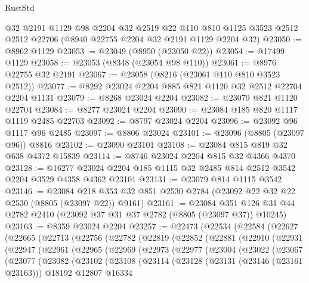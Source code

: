 \begin{lexlean}{RustStd}
\begin{coremodule}
    @32
    @2191
    @1129
    @98
    @2204
    @32
    @2519
    @22
    @110
    @810
    @1125
    @3523
    @2512
    @2512
    @22706
    (@8940 @22755 @2204 @32 @2191 @1129 @2204 @32)
@23050 := @8962 @1129
@23053 := @23049 (@8950 (@23050 @22))
@23054 := @17499 @1129
@23058 := @23053 (@8348 (@23054 @98 @110))
@23061 := @8976 @22755 @32 @2191
@23067 := @23058 (@8216 (@23061 @110 @810 @3523 @2512))
@23077 := @8292 @23024 @2204 @885 @821 @1120 @32 @2512 @22704 @2204 @1131
@23079 := @8268 @23024 @2204
@23082 := @23079 @821 @1120 @22704
@23084 := @8277 @23024 @2204
@23090 := @23084 @185 @820 @1117 @1119 @2485 @22703
@23092 := @8797 @23024 @2204
@23096 := @23092 @96 @1117 @96 @2485
@23097 := @8806 @23024
@23101 := @23096 (@8805 (@23097 @96)) @8816
@23102 := @23090 @23101
@23108 := @23084 @815 @819 @32 @638 @4372 @15839
@23114 := @8746 @23024 @2204 @815 @32 @4366 @4370
@23128 := @16277 @23024 @2204 @185 @1115 @32 @2485 @814 @2512 @3542 @2204 @3529 @4358 @4362 @23101
@23131 := @23079 @814 @1115 @3542
@23146 := @23084
    @218
    @353
    @32
    @851
    @2530
    @2784
    (@23092 @22 @32 @22 @2530 (@8805 (@23097 @22)) @9161)
@23161 := @23084
    @351
    @126
    @31
    @44
    @2782
    @2410
    (@23092 @37 @31 @37 @2782 (@8805 (@23097 @37)) @10245)
@23163 := @8359 @23024 @2204
@23257 := @22473
    (@22534
      (@22584
        (@22627
          (@22665
            (@22713
              (@22756
                (@22782
                  (@22819
                    (@22852
                      (@22881
                        (@22910
                          (@22931
                            (@22947
                              (@22961
                                (@22965
                                  (@22969
                                    (@22973
                                      (@22977
                                        (@23004
                                          (@23022
                                            (@23067
                                              (@23077
                                                (@23082
                                                  (@23102
                                                    (@23108
                                                      (@23114
                                                        (@23128
                                                          (@23131 (@23146 (@23161 @23163)))
                                                          @18192
                                                          @12807
                                                          @16334

\end{coremodule}
\end{lexlean}
